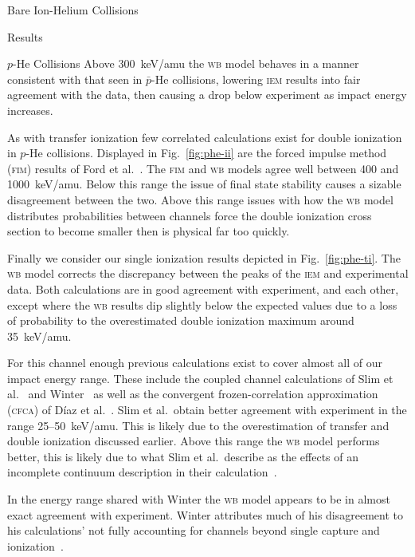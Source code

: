 \documentclass[letterpaper, 11 pt]{report}
\begin{document}
\begin{chapter}{Bare Ion-Helium Collisions \label{chap:p-he2p-he}}
\begin{section}{Results \label{sec:phe2p-res}}
\begin{subsection}{\texorpdfstring{$p$}{p}-He Collisions \label{sec:phe-res}}
         Above 300~keV/amu the \textsc{wb} model behaves in a manner consistent with that seen in
         $\bar{p}$-He collisions, lowering \textsc{iem} results into fair agreement with the data, then
         causing a drop below experiment as impact energy increases.

         As with transfer ionization few correlated calculations exist for double ionization in $p$-He
         collisions. Displayed in Fig.~\ref{fig:phe-ii} are the forced impulse method (\textsc{fim})
         results of Ford et al.~\cite{FR-94}. The \textsc{fim} and \textsc{wb} models agree well between
         400 and 1000~keV/amu. Below this range the issue of final state stability causes a sizable
         disagreement between the two. Above this range issues with how the \textsc{wb} model
         distributes probabilities between channels force  the double ionization cross section to become
         smaller then is physical far too quickly.

         Finally we consider our single ionization results depicted in Fig.~\ref{fig:phe-ti}. The
         \textsc{wb} model corrects the discrepancy between the peaks of the \textsc{iem} and
         experimental data. Both calculations are in good agreement with experiment, and each other,
         except where the \textsc{wb} results dip slightly below the expected values due to a loss of
         probability to the overestimated double ionization maximum around 35~keV/amu.

         For this channel enough previous calculations exist to cover almost all of our impact energy
         range. These include the coupled channel calculations of Slim et al.~\cite{SHBF-91} and
         Winter~\cite{Winter-91} as well as the convergent frozen-correlation approximation
         (\textsc{cfca}) of D\'{i}az et al.~\cite{DMS-00}. Slim et al.\ obtain better agreement with
         experiment in the range 25--50~keV/amu. This is likely due to the overestimation of transfer
         and double ionization discussed earlier. Above this range the \textsc{wb} model performs
         better, this is likely due to what Slim et al.\ describe as the effects of an incomplete
         continuum description in their calculation~\cite{SHBF-91}.

         In the energy range shared with Winter the \textsc{wb} model appears to be in almost exact
         agreement with experiment. Winter attributes much of his disagreement to his calculations' not
         fully accounting for channels beyond single capture and ionization~\cite{Winter-91}.


\end{subsection}
\end{section}
\end{chapter}
\end{document}
